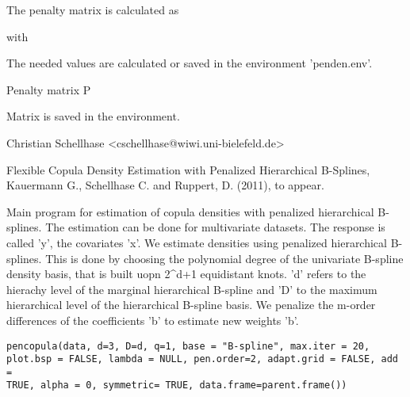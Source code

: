\documentclass[a4paper]{book}
\begin{document}
%
\begin{Details}\relax
The penalty matrix is calculated as


with


The needed values are calculated or saved in the environment 'penden.env'.
\end{Details}
%
\begin{Value}
\begin{ldescription}
\item[\code{DDD.sum}] Penalty matrix P
\end{ldescription}
Matrix is saved in the environment.
\end{Value}
%
\begin{Author}\relax
Christian Schellhase <cschellhase@wiwi.uni-bielefeld.de>
\end{Author}
%
\begin{References}\relax
Flexible Copula Density Estimation with Penalized
Hierarchical B-Splines, Kauermann G., Schellhase C. and Ruppert, D. (2011), to appear.
\end{References}
%
\begin{Description}\relax
Main program for estimation of copula densities with penalized
hierarchical B-splines. The estimation can be done for multivariate
datasets. The response is called 'y', the covariates 'x'. We estimate
densities using penalized hierarchical B-splines. This is done by
choosing the polynomial degree of the univariate B-spline density
basis, that is built uopn 2\textasciicircum{}d+1 equidistant knots. 'd' refers to the
hierachy level of the marginal hierarchical  B-spline and 'D' to the
maximum hierarchical level of the hierarchical B-spline basis. We penalize the m-order differences of the coefficients 'b' to estimate new weights 'b'.
\end{Description}
%
\begin{Usage}
\begin{verbatim}
pencopula(data, d=3, D=d, q=1, base = "B-spline", max.iter = 20,
plot.bsp = FALSE, lambda = NULL, pen.order=2, adapt.grid = FALSE, add =
TRUE, alpha = 0, symmetric= TRUE, data.frame=parent.frame())
\end{verbatim}
\end{Usage}
\end{document}

